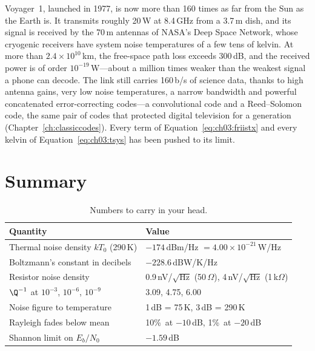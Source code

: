 \begin{history}
Voyager~1, launched in 1977, is now more than 160 times as far from the Sun as the Earth is. It transmits
roughly 20\,W at 8.4\,GHz from a 3.7\,m dish, and its signal is received by the 70\,m antennas of NASA's Deep
Space Network, whose cryogenic receivers have system noise temperatures of a few tens of kelvin. At more than
$2.4\times10^{10}$\,km, the free-space path loss exceeds 300\,dB, and the received power is of order
$10^{-19}$\,W---about a million times weaker than the weakest signal a phone can decode. The link still
carries 160\,b/s of science data, thanks to high antenna gains, very low noise temperatures, a narrow
bandwidth and powerful concatenated error-correcting codes---a convolutional code and a Reed--Solomon code,
the same pair of codes that protected digital television for a generation (Chapter~\ref{ch:classiccodes}).
Every term of Equation~\eqref{eq:ch03:friistx} and every kelvin of Equation~\eqref{eq:ch03:tsys} has been
pushed to its limit.
\end{history}

\section{Summary}
\label{sec:ch03:summary}

\begin{table}[htbp]\centering\small
\caption{Numbers to carry in your head.}
\label{tab:ch03:numbers}
\begin{tabular}{@{}ll@{}}
\toprule
Quantity & Value\\
\midrule
Thermal noise density $kT_0$ (290\,K) & $-174$\,dBm/Hz $=4.00\times10^{-21}$\,W/Hz\\
Boltzmann's constant in decibels & $-228.6$\,dBW/K/Hz\\
Resistor noise density & 0.9\,nV/$\sqrt{\text{Hz}}$ (50\,$\Omega$), 4\,nV/$\sqrt{\text{Hz}}$ (1\,k$\Omega$)\\
$\Q^{-1}$ at $10^{-3}$, $10^{-6}$, $10^{-9}$ & 3.09, 4.75, 6.00\\
Noise figure to temperature & 1\,dB = 75\,K, 3\,dB = 290\,K\\
Rayleigh fades below mean & 10\%\ at $-10$\,dB, 1\%\ at $-20$\,dB\\
Shannon limit on $E_b/N_0$ & $-1.59$\,dB\\
\bottomrule
\end{tabular}
\end{table}

